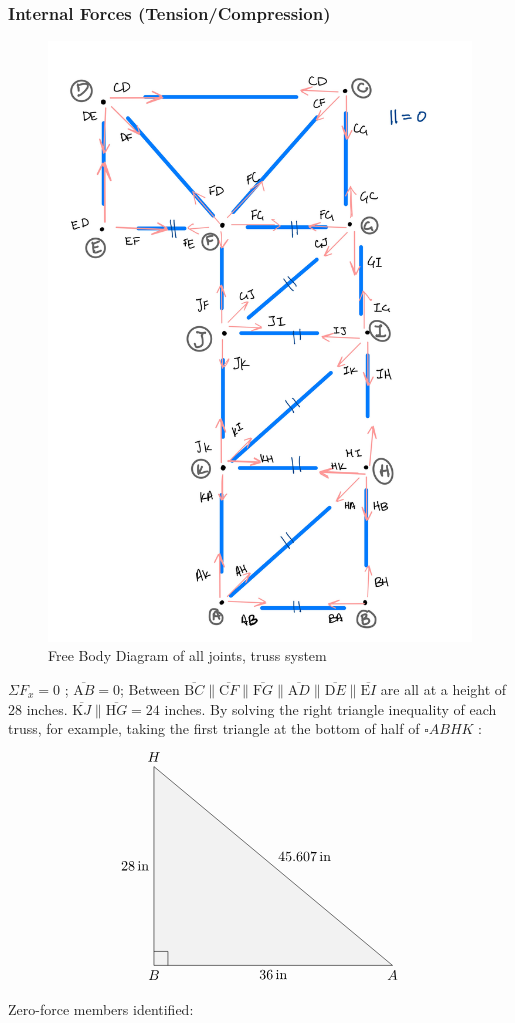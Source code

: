     \subsubsection{Internal Forces (Tension/Compression)}
\begin{figure}
\centering
\includegraphics[width=\textwidth]{con2_fbd.jpg}
\caption{Free Body Diagram of all joints, truss system}
\end{figure}
$ \Sigma F_x = 0 $ ; $ \overline{\mathrm AB} = 0$;
Between $\overline{\mathrm BC} \| \overline{\mathrm CF} \| \overline{\mathrm FG} \| \overline{\mathrm AD} \| \overline{\mathrm DE} \| \overline{\mathrm EI}$ are all at a height of $28$ inches. $\overline{\mathrm KJ} \| \overline{\mathrm HG} = 24 $ inches. By solving the right triangle inequality of each truss, for example, taking the first triangle at the bottom of half of $ \square ABHK$ : 
$$ \begin{tikzpicture}
        \draw[fill=gray!10]  (0, 0) coordinate (A) 
        -- node[left] {$28$\,in} (0,5) coordinate (C) 
        -- node[above right] {$45.607$\,in} (6,0) coordinate (B)  -- node[below] {$36$\,in}  (0, 0);
       \draw (0,10pt) -- ++(10pt,0) -- ++(0,-10pt);
        \node at (A)[anchor=north] {$B$};
        \node at (B)[anchor=north] {$A$};
        \node at (C)[anchor=south] {$H$};
      \end{tikzpicture} $$Zero-force members identified:
